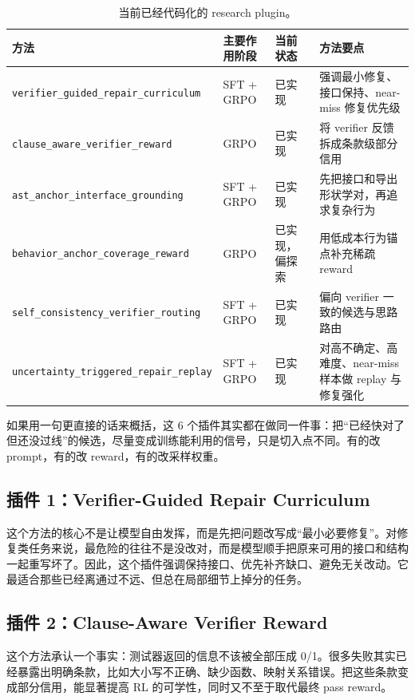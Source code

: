 \documentclass[11pt,a4paper]{article}
\newcommand{\code}[1]{\begingroup\ttfamily\footnotesize\nolinkurl{#1}\endgroup}
\begin{document}
\begin{table}[htbp]
\centering
\small
\begin{tabularx}{\textwidth}{p{3.0cm} p{2.1cm} p{2.0cm} Y}
\toprule
方法 & 主要作用阶段 & 当前状态 & 方法要点 \\
\midrule
\code{verifier_guided_repair_curriculum} & SFT + GRPO & 已实现 & 强调最小修复、接口保持、near-miss 修复优先级 \\
\code{clause_aware_verifier_reward} & GRPO & 已实现 & 将 verifier 反馈拆成条款级部分信用 \\
\code{ast_anchor_interface_grounding} & SFT + GRPO & 已实现 & 先把接口和导出形状学对，再追求复杂行为 \\
\code{behavior_anchor_coverage_reward} & GRPO & 已实现，偏探索 & 用低成本行为锚点补充稀疏 reward \\
\code{self_consistency_verifier_routing} & SFT + GRPO & 已实现 & 偏向 verifier 一致的候选与思路路由 \\
\code{uncertainty_triggered_repair_replay} & SFT + GRPO & 已实现 & 对高不确定、高难度、near-miss 样本做 replay 与修复强化 \\
\bottomrule
\end{tabularx}
\caption{当前已经代码化的 research plugin。}
\label{tab:plugin-catalog}
\end{table}

如果用一句更直接的话来概括，这 6 个插件其实都在做同一件事：把“已经快对了但还没过线”的候选，尽量变成训练能利用的信号，只是切入点不同。有的改 prompt，有的改 reward，有的改采样权重。

\subsection{插件 1：Verifier-Guided Repair Curriculum}

这个方法的核心不是让模型自由发挥，而是先把问题改写成“最小必要修复”。对修复类任务来说，最危险的往往不是没改对，而是模型顺手把原来可用的接口和结构一起重写坏了。因此，这个插件强调保持接口、优先补齐缺口、避免无关改动。它最适合那些已经离通过不远、但总在局部细节上掉分的任务。

\subsection{插件 2：Clause-Aware Verifier Reward}

这个方法承认一个事实：测试器返回的信息不该被全部压成 0/1。很多失败其实已经暴露出明确条款，比如大小写不正确、缺少函数、映射关系错误。把这些条款变成部分信用，能显著提高 RL 的可学性，同时又不至于取代最终 pass reward。
\end{document}

